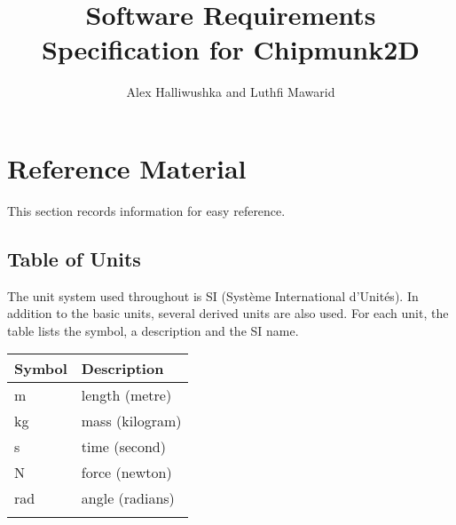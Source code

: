 \documentclass[12pt]{article}
\title{Software Requirements Specification for Chipmunk2D}
\author{Alex Halliwushka and Luthfi Mawarid}
\begin{document}
\maketitle
\tableofcontents
\newpage
\section{Reference Material}
\label{Sec:RM}
This section records information for easy reference.
\subsection{Table of Units}
\label{Sec:ToU}
The unit system used throughout is SI (Syst\`{e}me International d'Unit\'{e}s). In addition to the basic units, several derived units are also used. For each unit, the table lists the symbol, a description and the SI name.
\begin{longtable*}{l l}
\toprule
Symbol & Description
\\
\midrule
m & length (metre)
\\
kg & mass (kilogram)
\\
s & time (second)
\\
N & force (newton)
\\
rad & angle (radians)
\\
\bottomrule
\label{Table:ToU}
\end{longtable*}
\end{document}
